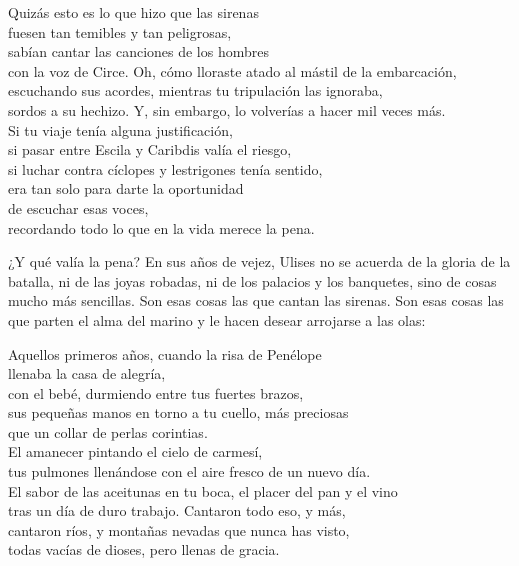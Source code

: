 \begin{versopropio}
Quizás esto es lo que hizo que las sirenas\\
fuesen tan temibles y tan peligrosas,\\
sabían cantar las canciones de los hombres\\
con la voz de Circe.
\stanzabreak
Oh, cómo lloraste atado al mástil de la embarcación,\\
escuchando sus acordes, mientras tu tripulación las ignoraba,\\
sordos a su hechizo. Y, sin embargo, lo volverías a hacer mil veces más.\\
Si tu viaje tenía alguna justificación,\\
si pasar entre Escila y Caribdis valía el riesgo,\\
si luchar contra cíclopes y lestrigones tenía sentido,\\
era tan solo para darte la oportunidad\\
de escuchar esas voces,\\
recordando todo lo que en la vida merece la pena.
\end{versopropio}

¿Y qué valía la pena? En sus años de vejez, Ulises no se acuerda de la gloria de la batalla, ni de las joyas robadas, ni de los palacios y los banquetes, sino de cosas mucho más sencillas. Son esas cosas las que cantan las sirenas. Son esas cosas las que parten el alma del marino y le hacen desear arrojarse a las olas:

\begin{versopropio}
Aquellos primeros años, cuando la risa de Penélope\\
llenaba la casa de alegría,\\
con el bebé, durmiendo entre tus fuertes brazos,\\
sus pequeñas manos en torno a tu cuello, más preciosas\\
que un collar de perlas corintias.\\
El amanecer pintando el cielo de carmesí,\\
tus pulmones llenándose con el aire fresco de un nuevo día.\\
El sabor de las aceitunas en tu boca, el placer del pan y el vino\\
tras un día de duro trabajo. Cantaron todo eso, y más,\\
cantaron ríos, y montañas nevadas que nunca has visto,\\
todas vacías de dioses, pero llenas de gracia.
\end{versopropio}

